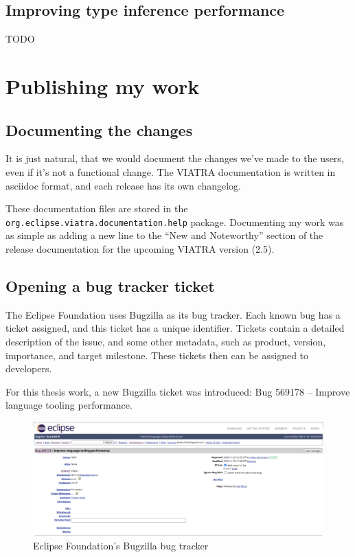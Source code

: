 \documentclass[11pt,a4paper,oneside]{report}
\begin{document}
\section{Improving type inference performance}
TODO

\chapter{Publishing my work}
\section{Documenting the changes}
It is just natural, that we would document the changes we've made to the users,
even if it's not a functional change. The VIATRA documentation is written in
asciidoc format, and each release has its own changelog.

These documentation files are stored in the
\texttt{org.eclipse.viatra.documentation.help} package. Documenting my work was
as simple as adding a new line to the ``New and Noteworthy'' section of the
release documentation for the upcoming VIATRA version (2.5).

\section{Opening a bug tracker ticket}
The Eclipse Foundation uses Bugzilla as its bug tracker. Each known bug has a
ticket assigned, and this ticket has a unique identifier. Tickets contain
a detailed description of the issue, and some other metadata, such as product,
version, importance, and target milestone. These tickets then can be assigned to
developers.

For this thesis work, a new Bugzilla ticket was introduced:
Bug 569178 -- Improve language tooling performance.

\begin{figure}[ht]
\centering
\includegraphics[width=150mm, keepaspectratio]{figures/bugzilla.png}
\caption{Eclipse Foundation's Bugzilla bug tracker}
\label{fig:bugzilla}
\end{figure}
\end{document}
